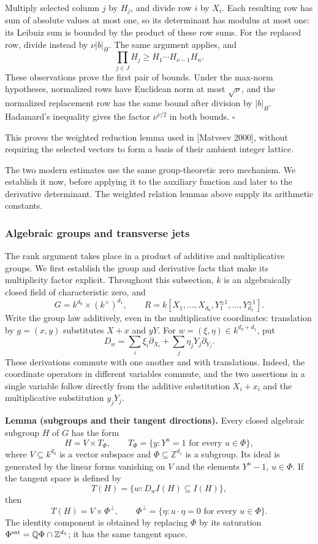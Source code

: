 \documentclass[
  11pt,
  a4paper,
]{article}
\begin{document}
Multiply selected column \(j\) by \(H_j\), and divide row \(i\) by
\(X_i\). Each resulting row has sum of absolute values at most one, so
its determinant has modulus at most one: its Leibniz sum is bounded by
the product of these row sums. For the replaced row, divide instead by
\(\nu|b|_H\). The same argument applies, and \[
\prod_{j\in J}H_j\ge H_1\cdots H_{\nu-1}H_n.
\] These observations prove the first pair of bounds. Under the max-norm
hypotheses, normalized rows have Euclidean norm at most \(\sqrt\nu\),
and the normalized replacement row has the same bound after division by
\(|b|_H\). Hadamard's inequality gives the factor \(\nu^{\nu/2}\) in
both bounds. \(\square\)

This proves the weighted reduction lemma used in {[}Matveev 2000{]},
without requiring the selected vectors to form a basis of their ambient
integer lattice.

The two modern estimates use the same group-theoretic zero mechanism. We
establish it now, before applying it to the auxiliary function and later
to the derivative determinant. The weighted relation lemmas above supply
its arithmetic constants.

\subsubsection{Algebraic groups and transverse
jets}\label{algebraic-groups-and-transverse-jets}

The rank argument takes place in a product of additive and
multiplicative groups. We first establish the group and derivative facts
that make its multiplicity factor explicit. Throughout this subsection,
\(k\) is an algebraically closed field of characteristic zero, and \[
G=k^{d_0}\times(k^\times)^{d_1},\qquad
R=k[X_1,\ldots,X_{d_0},Y_1^{\pm1},\ldots,Y_{d_1}^{\pm1}].
\] Write the group law additively, even in the multiplicative
coordinates: translation by \(g=(x,y)\) substitutes \(X+x\) and \(yY\).
For \(w=(\xi,\eta)\in k^{d_0+d_1}\), put \[
D_w=\sum_i\xi_i\partial_{X_i}+
\sum_j\eta_jY_j\partial_{Y_j}.
\tag{8.56}
\] These derivations commute with one another and with translations.
Indeed, the coordinate operators in different variables commute, and the
two assertions in a single variable follow directly from the additive
substitution \(X_i+x_i\) and the multiplicative substitution \(y_jY_j\).

\textbf{Lemma (subgroups and their tangent directions).} Every closed
algebraic subgroup \(H\) of \(G\) has the form \[
H=V\times T_\Phi,\qquad
T_\Phi=\{y:Y^u=1\text{ for every }u\in\Phi\},
\tag{8.57}
\] where \(V\subseteq k^{d_0}\) is a vector subspace and
\(\Phi\subseteq\mathbb Z^{d_1}\) is a subgroup. Its ideal is generated
by the linear forms vanishing on \(V\) and the elements \(Y^u-1\),
\(u\in\Phi\). If the tangent space is defined by \[
T(H)=\{w:D_wI(H)\subseteq I(H)\},
\] then \[
T(H)=V\times\Phi^\perp,\qquad
\Phi^\perp=\{\eta:u\cdot\eta=0\text{ for every }u\in\Phi\}.
\tag{8.58}
\] The identity component is obtained by replacing \(\Phi\) by its
saturation \(\Phi^{\rm sat}=\mathbb Q\Phi\cap\mathbb Z^{d_1}\); it has
the same tangent space.
\end{document}

